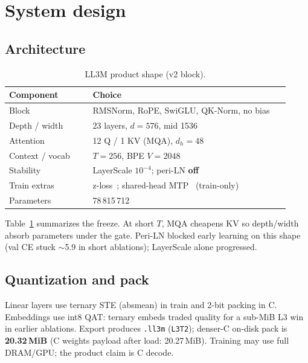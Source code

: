 \documentclass[11pt,a4paper]{article}
\begin{document}
\section{System design}
\label{sec:system}

\subsection{Architecture}
\label{sec:arch}

\begin{table}[H]
\centering
\caption{LL3M product shape (v2 block).}
\label{tab:shape}
\small
\begin{tabular}{@{}p{0.28\linewidth}p{0.66\linewidth}@{}}
\toprule
Component & Choice \\
\midrule
Block & RMSNorm, RoPE, SwiGLU, QK-Norm, no bias \\
Depth / width & 23 layers, $d{=}576$, mid 1536 \\
Attention & 12 Q / 1 KV (MQA), $d_h{=}48$~\citep{shazeer2019mqa,ainslie2023gqa} \\
Context / vocab & $T{=}256$, BPE $V{=}2048$ \\
Stability & LayerScale $10^{-4}$; peri-LN \textbf{off} \\
Train extras & z-loss~\citep{palm2022}; shared-head MTP~\citep{deepseekv3} (train-only) \\
Parameters & 78\,815\,712 \\
\bottomrule
\end{tabular}
\end{table}

Table~\ref{tab:shape} summarizes the freeze.
At short $T$, MQA cheapens KV so depth/width absorb parameters under the gate.
Peri-LN blocked early learning on this shape (val CE stuck $\sim$5.9 in short ablations); LayerScale alone progressed.

\subsection{Quantization and pack}
\label{sec:quant}

Linear layers use ternary STE (absmean) in train and 2-bit packing in C.
Embeddings use int8 QAT: ternary embeds traded quality for a sub-MiB L3 win in earlier ablations.
Export produces \texttt{.ll3m} (\texttt{L3T2}); denser-C on-disk pack is \textbf{20.32\,MiB} (C weights payload after load: 20.27\,MiB).
Training may use full DRAM/GPU; the product claim is C decode.
\end{document}
